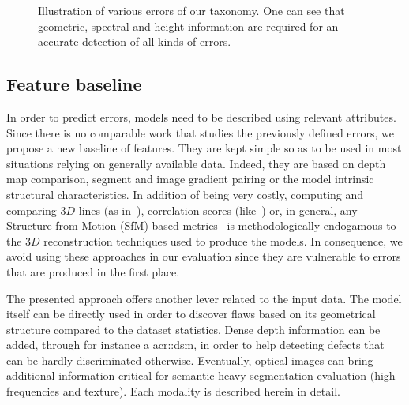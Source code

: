 \documentclass[runningheads]{llncs}
\def\thesubfigure{\textit{\alph{subfigure}}}
\newcounter{SubFigCounter}
\begin{document}
\begin{figure}
\begin{center}
{{                }
                {
                    \renewcommand{\thesubfigure}{\roman{SubFigCounter}}
					\vspace{-.3cm}
                    \label{fig::fac_err}
                    \addtocounter{figure}{-1}
                }
            }
            {
            	\vspace{-.3cm}
                \caption{\label{fig::samples}Illustration of various errors of our taxonomy. One can see that geometric, spectral and height information are required for an accurate detection of all kinds of errors.}
            }
        \end{center}
    \end{figure}

\subsection{Feature baseline}
In order to predict errors, models need to be described using relevant attributes. Since there is no comparable work that studies the previously defined errors, we propose a new baseline of features. They are kept simple so as to be used in most situations relying on generally available data. Indeed, they are based on depth map comparison, segment and image gradient pairing or the model intrinsic structural characteristics. In addition of being very costly, computing and comparing $3D$ lines (as in~\cite{Michelin2013}), correlation scores (like~\cite{boudet2006supervised}) or, in general, any Structure-from-Motion (SfM) based metrics~\cite{kowdle2011active} is methodologically endogamous to the $3D$ reconstruction techniques used to produce the  models. In consequence, we avoid using these approaches in our evaluation since they are vulnerable to errors that are produced in the first place.

The presented approach offers another lever related to the input data. The model itself can be directly used in order to discover flaws based on its geometrical structure compared to the dataset statistics. Dense depth information can be added, through for instance a \acrshort{acr::dsm}, in order to help detecting defects that can be hardly discriminated otherwise. Eventually, optical images can bring additional information critical for semantic heavy segmentation evaluation (high frequencies and texture). Each modality is described herein in detail.
\end{document}

